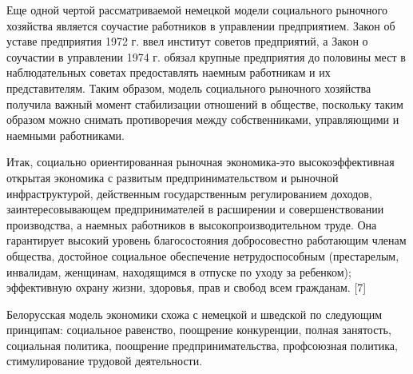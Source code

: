 \documentclass[14pt,a4paper]{article}
\begin{document}
    \par
    Еще одной чертой рассматриваемой немецкой модели социального рыночного хозяйства является соучастие работников в управлении предприятием.
    Закон об уставе предприятия 1972 г. ввел институт советов предприятий, а Закон о соучастии в управлении 1974 г. обязал крупные предприятия до половины мест в наблюдательных советах предоставлять наемным работникам и их представителям.
    Таким образом, модель социального рыночного хозяйства получила важный момент стабилизации отношений в обществе, поскольку таким образом можно снимать противоречия между собственниками, управляющими и наемными работниками.
    \par
    Итак, социально ориентированная рыночная экономика-это высокоэффективная открытая экономика с развитым предпринимательством и рыночной инфраструктурой, действенным государственным регулированием доходов, заинтересовывающем предпринимателей в расширении и совершенствовании производства, а наемных работников в высокопроизводительном труде.
    Она гарантирует высокий уровень благосостояния добросовестно работающим членам общества, достойное социальное обеспечение нетрудоспособным (престарелым, инвалидам, женщинам, находящимся в отпуске по уходу за ребенком); эффективную охрану жизни, здоровья, прав и свобод всем гражданам. [7]
    \par
    Белорусская модель экономики схожа с немецкой и шведской по следующим принципам: социальное равенство, поощрение конкуренции, полная занятость, социальная политика, поощрение предпринимательства, профсоюзная политика, стимулирование трудовой деятельности.
\end{document}
